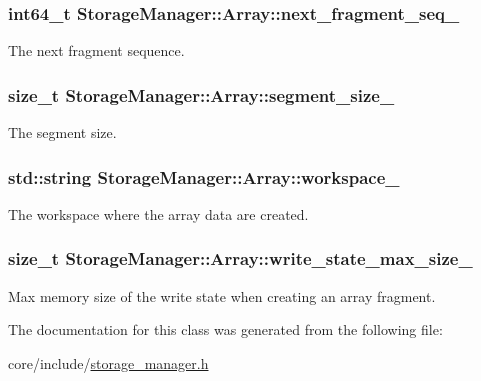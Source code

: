 \subsubsection[{next\+\_\+fragment\+\_\+seq\+\_\+}]{\setlength{\rightskip}{0pt plus 5cm}int64\+\_\+t Storage\+Manager\+::\+Array\+::next\+\_\+fragment\+\_\+seq\+\_\+\hspace{0.3cm}{\ttfamily [private]}}\label{classStorageManager_1_1Array_a4f3b670bdd10b8e72bc560d1357622ab}
The next fragment sequence. \hypertarget{classStorageManager_1_1Array_a5af267d88338c68aee3fc7586b063bf0}{}
\subsubsection[{segment\+\_\+size\+\_\+}]{\setlength{\rightskip}{0pt plus 5cm}size\+\_\+t Storage\+Manager\+::\+Array\+::segment\+\_\+size\+\_\+\hspace{0.3cm}{\ttfamily [private]}}\label{classStorageManager_1_1Array_a5af267d88338c68aee3fc7586b063bf0}
The segment size. \hypertarget{classStorageManager_1_1Array_ad83e2d64d928cb81ccd29c87a91d5c90}{}
\subsubsection[{workspace\+\_\+}]{\setlength{\rightskip}{0pt plus 5cm}std\+::string Storage\+Manager\+::\+Array\+::workspace\+\_\+\hspace{0.3cm}{\ttfamily [private]}}\label{classStorageManager_1_1Array_ad83e2d64d928cb81ccd29c87a91d5c90}
The workspace where the array data are created. \hypertarget{classStorageManager_1_1Array_a84d19e5428f5c04b63d294acd5fa71d6}{}
\subsubsection[{write\+\_\+state\+\_\+max\+\_\+size\+\_\+}]{\setlength{\rightskip}{0pt plus 5cm}size\+\_\+t Storage\+Manager\+::\+Array\+::write\+\_\+state\+\_\+max\+\_\+size\+\_\+\hspace{0.3cm}{\ttfamily [private]}}\label{classStorageManager_1_1Array_a84d19e5428f5c04b63d294acd5fa71d6}
Max memory size of the write state when creating an array fragment. 

The documentation for this class was generated from the following file\+:\begin{DoxyCompactItemize}
\item 
core/include/\hyperlink{storage__manager_8h}{storage\+\_\+manager.\+h}\end{DoxyCompactItemize}
